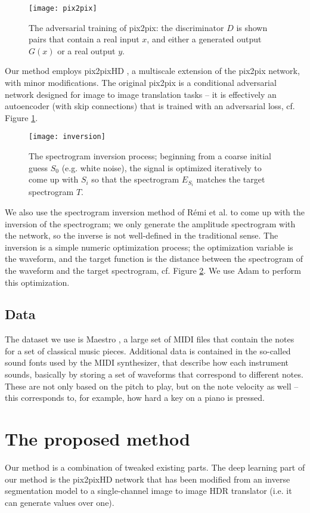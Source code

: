 \documentclass[12pt]{article}
\begin{document}
\begin{figure}
\centering
\texttt{[image: pix2pix]}
\caption{The adversarial training of pix2pix: the discriminator $D$ is shown pairs that contain a real input $x$, and either a generated output $G(x)$ or a real output $y$.} \label{fig:pix2pix}
\end{figure}

Our method employs  pix2pixHD \cite{pix2pixHD}, a multiscale extension of the pix2pix \cite{pix2pix} network, with minor modifications. The original pix2pix is a conditional adversarial network designed for image to image translation tasks -- it is effectively an autoencoder (with skip connections) that is trained with an adversarial loss, cf. Figure \ref{fig:pix2pix}.

\begin{figure}
\centering
\texttt{[image: inversion]}
\caption{The spectrogram inversion process; beginning from a coarse initial guess $S_0$ (e.g. white noise), the signal is optimized iteratively to come up with $S_i$ so that the spectrogram $E_{S_i}$ matches the target spectrogram $T$.} \label{fig:spectrogram_inv}
\end{figure}

We also use the spectrogram inversion method of Rémi et al. \cite{spectrogram_inv} to come up with the inversion of the spectrogram; we only generate the amplitude spectrogram with the network, so the inverse is not well-defined in the traditional sense. The inversion is a simple numeric optimization process; the optimization variable is the waveform, and the target function is the distance between the spectrogram of the waveform and the target spectrogram, cf. Figure \ref{fig:spectrogram_inv}. We use Adam to perform this optimization.

\subsection{Data}
The dataset we use is Maestro \cite{maestro}, a large set of MIDI files that contain the notes for a set of classical music pieces. Additional data is contained in the so-called sound fonts used by the MIDI synthesizer, that describe how each instrument sounds, basically by storing a set of waveforms that correspond to different notes. These are not only based on the pitch to play, but on the note velocity as well -- this corresponds to, for example, how hard a key on a piano is pressed.

\section{The proposed method}
Our method is a combination of tweaked existing parts. The deep learning part of our method is the pix2pixHD network that has been modified from an inverse segmentation model to a single-channel image to image HDR translator (i.e. it can generate values over one).
\end{document}
